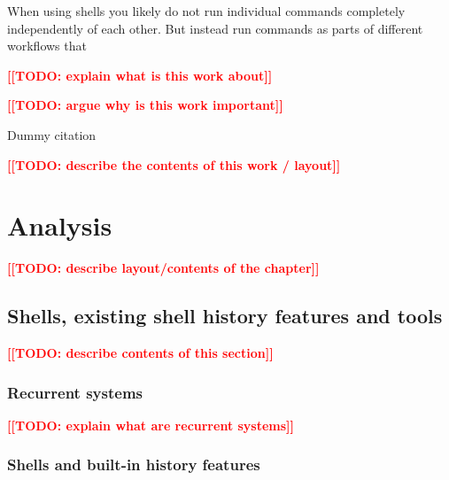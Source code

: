 \documentclass[thesis=M,english]{FITthesis}[2012/10/20]
\newcommand{\todotext}[1]{\textcolor{red}{\textbf{[[#1]]}}}
\newcommand{\blind}[1][1]{\textcolor{mygray}{\Blindtext[#1][1]}}
\newcommand{\tmpframe}[1]{\fbox{#1}}
\let\myCite\cite
\renewcommand\cite{\unskip~\myCite}
\begin{document}
\begin{introduction}
When using shells you likely do not run individual commands completely independently of each other. But instead run commands as parts of different workflows that 



\todotext{TODO: explain what is this work about}

\todotext{TODO: argue why is this work important}



Dummy citation \cite{greenberg1993computer}

\blind[0]

\todotext{TODO: describe the contents of this work / layout}

\blind[2]

\end{introduction}


\chapter{Analysis}

\todotext{TODO: describe layout/contents of the chapter}

\blind

\section{Shells, existing shell history features and tools}

\todotext{TODO: describe contents of this section}

\blind

\subsection{Recurrent systems}

\todotext{TODO: explain what are recurrent systems}

\blind

\subsection{Shells and built-in history features}

\end{document}
